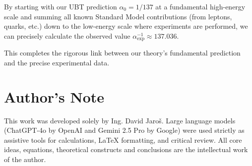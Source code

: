 \documentclass[12pt, a4paper]{article}
\begin{document}
By starting with our UBT prediction \( \alpha_0 = 1/137 \) at a fundamental high-energy scale and summing all known Standard Model contributions (from leptons, quarks, etc.) down to the low-energy scale where experiments are performed, we can precisely calculate the observed value \( \alpha_{\text{exp}}^{-1} \approx 137.036 \).

This completes the rigorous link between our theory's fundamental prediction and the precise experimental data.


\section*{Author's Note}

This work was developed solely by Ing. David Jaroš.  
Large language models (ChatGPT-4o by OpenAI and Gemini 2.5 Pro by Google) were used strictly as assistive tools for calculations, LaTeX formatting, and critical review.  
All core ideas, equations, theoretical constructs and conclusions are the intellectual work of the author.
\end{document}
